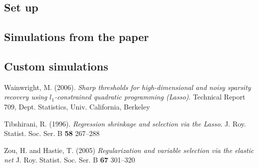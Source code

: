 \documentclass[letterpaper,12pt]{article}
\begin{document}
\subsection*{Set up}

\subsection*{Simulations from the paper}

\subsection*{Custom simulations}

\begin{thebibliography}{9}
  Wainwright, M. (2006).
  \textit{Sharp thresholds for high-dimensional and noisy sparsity
    recovery using $l_1$-constrained quadratic programming (Lasso)}.
  Technical Report 709, Dept. Statistics, Univ. California,
  Berkeley

  Tibshirani, R. (1996).
  \textit{Regression shrinkage and selection via the Lasso}.
  J. Roy. Statist. Soc. Ser. B \textbf{58} 267--288

  Zou, H. and Hastie, T. (2005)
  \textit{Regularization and variable selection via the elastic net}
  J. Roy. Statist. Soc. Ser. B \textbf{67} 301--320

\end{thebibliography}
\end{document}
